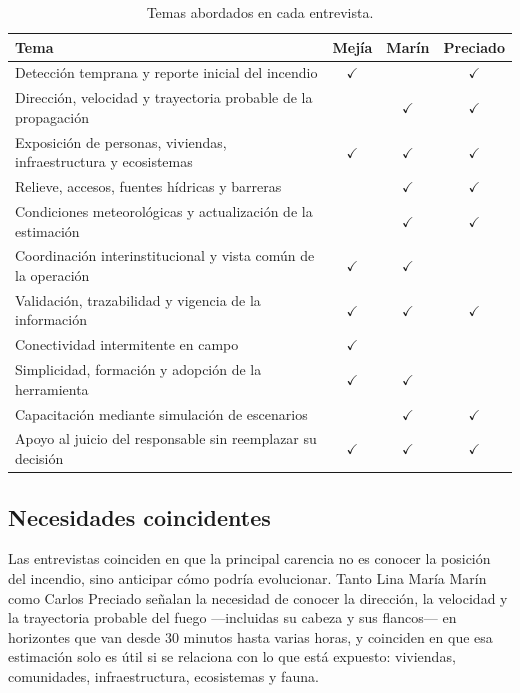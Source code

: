 \begin{table}[htbp]
\centering
\caption{Temas abordados en cada entrevista.}
\label{tab:temas}
\small
\renewcommand{\arraystretch}{1.2}
\begin{tabularx}{\textwidth}{|Y|C|C|C|}
\hline
\textbf{Tema} & \textbf{Mejía} & \textbf{Marín} & \textbf{Preciado} \\
\hline
Detección temprana y reporte inicial del incendio & $\checkmark$ & & $\checkmark$ \\
\hline
Dirección, velocidad y trayectoria probable de la propagación & & $\checkmark$ & $\checkmark$ \\
\hline
Exposición de personas, viviendas, infraestructura y ecosistemas & $\checkmark$ & $\checkmark$ & $\checkmark$ \\
\hline
Relieve, accesos, fuentes hídricas y barreras & & $\checkmark$ & $\checkmark$ \\
\hline
Condiciones meteorológicas y actualización de la estimación & & $\checkmark$ & $\checkmark$ \\
\hline
Coordinación interinstitucional y vista común de la operación & $\checkmark$ & $\checkmark$ & \\
\hline
Validación, trazabilidad y vigencia de la información & $\checkmark$ & $\checkmark$ & $\checkmark$ \\
\hline
Conectividad intermitente en campo & $\checkmark$ & & \\
\hline
Simplicidad, formación y adopción de la herramienta & $\checkmark$ & $\checkmark$ & \\
\hline
Capacitación mediante simulación de escenarios & & $\checkmark$ & $\checkmark$ \\
\hline
Apoyo al juicio del responsable sin reemplazar su decisión & $\checkmark$ & $\checkmark$ & $\checkmark$ \\
\hline
\end{tabularx}
\end{table}

\subsection{Necesidades coincidentes}

Las entrevistas coinciden en que la principal carencia no es conocer la posición del incendio, sino anticipar cómo podría evolucionar. Tanto Lina María Marín como Carlos Preciado señalan la necesidad de conocer la dirección, la velocidad y la trayectoria probable del fuego ---incluidas su cabeza y sus flancos--- en horizontes que van desde 30 minutos hasta varias horas, y coinciden en que esa estimación solo es útil si se relaciona con lo que está expuesto: viviendas, comunidades, infraestructura, ecosistemas y fauna.

